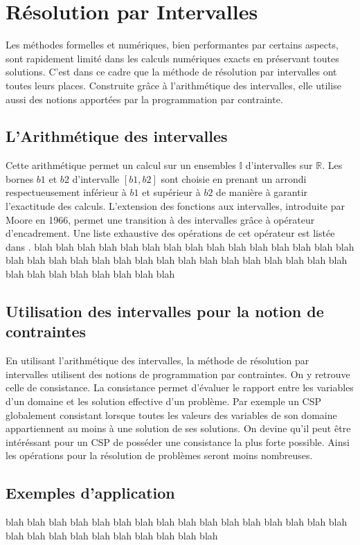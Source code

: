 \section{Résolution par Intervalles}
Les méthodes formelles et numériques, bien performantes par certains aspects, sont rapidement limité dans les calculs numériques exacts en préservant toutes solutions. C'est dans ce cadre que la méthode de résolution par intervalles ont toutes leurs places. Construite grâce à l'arithmétique des intervalles, elle utilise aussi des notions apportées par la programmation par contrainte.
 
\subsection{L'Arithmétique des intervalles}
Cette arithmétique permet un calcul sur un ensembles $\mathbb{I}$ d'intervalles sur $\mathbb{R}$. Les bornes $b1$ et $b2$ d'intervalle $[b1,b2]$ sont choisie en prenant un arrondi respectueusement inférieur à $b1$ et supérieur à $b2$ de manière à garantir l'exactitude des calculs. L'extension des fonctions aux intervalles, introduite par Moore en 1966, permet une transition à des intervalles grâce à opérateur d'encadrement. Une liste exhaustive des opérations de cet opérateur est listée dans \cite{Jermann}. blah blah blah blah blah blah blah blah blah blah blah blah blah blah blah blah blah blah blah blah blah blah blah blah blah blah blah blah blah blah blah blah blah blah blah blah blah blah blah
\subsection{Utilisation des intervalles pour la notion de contraintes}
En utilisant l'arithmétique des intervalles, la méthode de résolution par intervalles utilisent des notions de programmation par contraintes. On y retrouve celle de consistance. La consistance permet d'évaluer le rapport entre les variables d'un domaine et les solution effective d'un problème. Par exemple un CSP globalement consistant lorsque toutes les valeurs des variables de son domaine appartiennent au moins à une solution de ses solutions. On devine qu'il peut être intéréssant pour un CSP de posséder une consistance la plus forte possible. Ainsi les opérations pour la résolution de problèmes seront moins nombreuses. 


\subsection{Exemples d'application}
 blah blah blah blah blah blah blah blah blah blah blah blah blah blah blah blah blah blah blah blah blah blah blah blah blah blah

